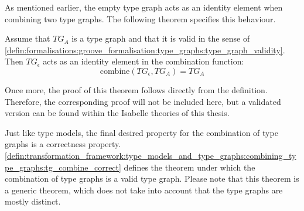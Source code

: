 As mentioned earlier, the empty type graph acts as an identity element when combining two type graphs. The following theorem specifies this behaviour.

\begin{thm}
\label{defin:transformation_framework:type_models_and_type_graphs:combining_type_graphs:tg_combine_identity}
Assume that $TG_A$ is a type graph and that it is valid in the sense of \cref{defin:formalisations:groove_formalisation:type_graphs:type_graph_validity}. Then $TG_{\epsilon}$ acts as an identity element in the combination function:
\begin{equation*}
    \mathrm{combine}(TG_{\epsilon}, TG_A) = TG_A
\end{equation*}
\end{thm}

Once more, the proof of this theorem follows directly from the definition. Therefore, the corresponding proof will not be included here, but a validated version can be found within the Isabelle theories of this thesis.

Just like type models, the final desired property for the combination of type graphs is a correctness property. \cref{defin:transformation_framework:type_models_and_type_graphs:combining_type_graphs:tg_combine_correct} defines the theorem under which the combination of type graphs is a valid type graph. Please note that this theorem is a generic theorem, which does not take into account that the type graphs are mostly distinct.

